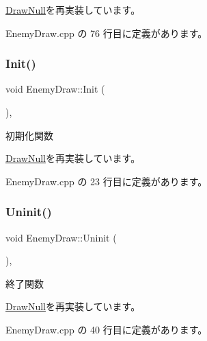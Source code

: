 \mbox{\hyperlink{class_draw_null_a001901c340671106a33d44b9d4aef4c4}{Draw\+Null}}を再実装しています。



 Enemy\+Draw.\+cpp の 76 行目に定義があります。

\mbox{\label{class_enemy_draw_aa1659c35fa757db6a6cf07e26ad9ddfb}} 
\subsubsection{\texorpdfstring{Init()}{Init()}}
{\footnotesize\ttfamily void Enemy\+Draw\+::\+Init (\begin{DoxyParamCaption}{ }\end{DoxyParamCaption})\hspace{0.3cm}{\ttfamily [override]}, {\ttfamily [virtual]}}



初期化関数 



\mbox{\hyperlink{class_draw_null_acd7fef3ccea1da537ac9507ffbb6dd2e}{Draw\+Null}}を再実装しています。



 Enemy\+Draw.\+cpp の 23 行目に定義があります。

\mbox{\label{class_enemy_draw_a2861dc0623b0be7726bc69a6a469190e}} 
\subsubsection{\texorpdfstring{Uninit()}{Uninit()}}
{\footnotesize\ttfamily void Enemy\+Draw\+::\+Uninit (\begin{DoxyParamCaption}{ }\end{DoxyParamCaption})\hspace{0.3cm}{\ttfamily [override]}, {\ttfamily [virtual]}}



終了関数 



\mbox{\hyperlink{class_draw_null_a12d44e341c7364b5ab9cdd661dc16187}{Draw\+Null}}を再実装しています。



 Enemy\+Draw.\+cpp の 40 行目に定義があります。



